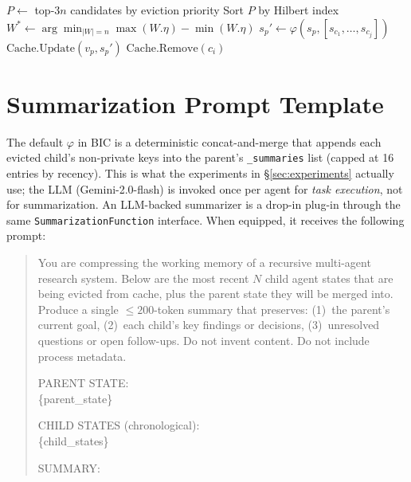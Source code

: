 \documentclass{article}
\newcommand{\summarize}{\varphi}
\begin{document}
\begin{algorithm}[t]
\caption{\textsc{Evict}$(n)$ — evict $n$ agents with Hilbert clustering.}
\label{alg:evict}
\begin{algorithmic}[1]
  \STATE $P \gets$ top-$3n$ candidates by eviction priority
  \STATE Sort $P$ by Hilbert index
  \STATE $W^* \gets \arg\min_{|W|=n} \max(W.\eta) - \min(W.\eta)$
    \STATE $s_p' \gets \summarize(s_p, [s_{c_1}, \dots, s_{c_j}])$
    \STATE $\mathrm{Cache.Update}(v_p, s_p')$
      \STATE $\mathrm{Cache.Remove}(c_i)$
    \ENDFOR
  \ENDFOR
\end{algorithmic}
\end{algorithm}

\section{Summarization Prompt Template}
\label{app:summary-prompt}

The default $\summarize$ in BIC is a deterministic concat-and-merge that
appends each evicted child's non-private keys into the parent's
\texttt{\_summaries} list (capped at 16 entries by recency).  This is what
the experiments in \S\ref{sec:experiments} actually use; the LLM
(Gemini-2.0-flash) is invoked once per agent for \emph{task execution},
not for summarization.  An LLM-backed summarizer is a drop-in plug-in
through the same \texttt{SummarizationFunction} interface.  When equipped,
it receives the following prompt:

\begin{quote}\small\ttfamily
You are compressing the working memory of a recursive multi-agent
research system.  Below are the most recent $N$ child agent states
that are being evicted from cache, plus the parent state they will be
merged into.  Produce a single $\leq 200$-token summary that
preserves: (1)~the parent's current goal, (2)~each child's key
findings or decisions, (3)~unresolved questions or open follow-ups.
Do not invent content.  Do not include process metadata.

PARENT STATE:\\
\{parent\_state\}

CHILD STATES (chronological):\\
\{child\_states\}

SUMMARY:
\end{quote}
\end{document}
